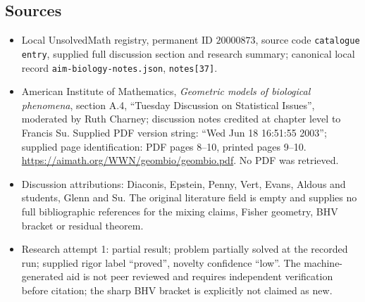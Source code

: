 \documentclass[11pt]{article}
\begin{document}
\subsection{Sources}
\begin{itemize}
\item Local UnsolvedMath registry, permanent ID $20000873$, source code \texttt{catalogue entry}, supplied full discussion section and research summary; canonical local record \texttt{aim-biology-notes.json}, \texttt{notes[37]}.
\item American Institute of Mathematics, \emph{Geometric models of biological phenomena}, section A.4, ``Tuesday Discussion on Statistical Issues'', moderated by Ruth Charney; discussion notes credited at chapter level to Francis Su. Supplied PDF version string: ``Wed Jun 18 16:51:55 2003''; supplied page identification: PDF pages 8--10, printed pages 9--10. \url{https://aimath.org/WWN/geombio/geombio.pdf}. No PDF was retrieved.
\item Discussion attributions: Diaconis, Epstein, Penny, Vert, Evans, Aldous and students, Glenn and Su. The original literature field is empty and supplies no full bibliographic references for the mixing claims, Fisher geometry, BHV bracket or residual theorem.
\item Research attempt 1: partial result; problem partially solved at the recorded run; supplied rigor label ``proved'', novelty confidence ``low''. The machine-generated aid is not peer reviewed and requires independent verification before citation; the sharp BHV bracket is explicitly not claimed as new.
\end{itemize}
\end{document}

